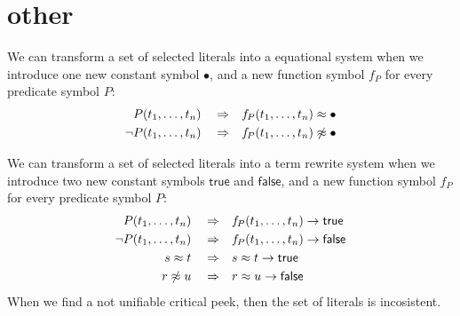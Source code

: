 
\chapter{other}


We can transform a set of selected literals into a equational system 
when we introduce one new constant symbol $\bullet$,
and a new function symbol $f\!_P$ for every predicate symbol $P$:
\begin{align*}
	P(t_1,\ldots,t_n) \quad\Rightarrow&\quad f\!_P(t_1,\ldots,t_n) \approx \bullet \\ 
	\lnot P(t_1,\ldots,t_n) \quad\Rightarrow&\quad f\!_P(t_1,\ldots,t_n) \not\approx \bullet
\end{align*}


We can transform a set of selected literals into a term rewrite system 
when we introduce two new constant symbols $\mathsf{true}$ and $\mathsf{false}$,
and a new function symbol $f\!_P$ for every predicate symbol $P$:
\begin{align*}
P(t_1,\ldots,t_n) \quad\Rightarrow &\quad f\!_P(t_1,\ldots,t_n) \rightarrow \mathsf{true} 
\\ 
\lnot P(t_1,\ldots,t_n) \quad\Rightarrow &\quad f\!_P(t_1,\ldots,t_n) \rightarrow \mathsf{false} 
\\
s \approx t \quad\Rightarrow&\quad s \approx t\rightarrow \mathsf{true} 
\\ 
r \not\approx u \quad\Rightarrow&\quad r \approx u\rightarrow  \mathsf{false}
\end{align*}
When we find a not unifiable critical peek, then the set of literals is incosistent.




